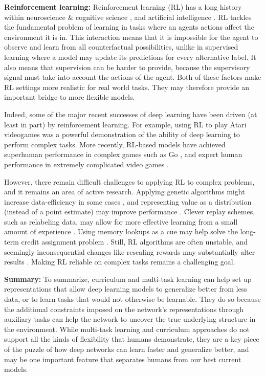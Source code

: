 \textbf{Reinforcement learning:} Reinforcement learning (RL) has a long history within neuroscience \& cognitive science \citep{Odoherty2003,Niv2009,Dabney2020}, and artificial intelligence \citep{Sutton2017}. RL tackles the fundamental problem of learning in tasks where an agents actions affect the environment it is in. This interaction means that it is impossible for the agent to observe and learn from all counterfactual possibilities, unlike in supervised learning where a model may update its predictions for every alternative label. It also means that supervision can be harder to provide, because the supervisory signal must take into account the actions of the agent. Both of these factors make RL settings more realistic for real world tasks. They may therefore provide an important bridge to more flexible models.\par 
Indeed, some of the major recent successes of deep learning have been driven (at least in part) by reinforcement learning. For example, using RL to play Atari videogames \citep{Mnih2015} was a powerful demonstration of the ability of deep learning to perform complex tasks. More recently, RL-based models have achieved superhuman performance in complex games such as Go \citep{Silver2016,Silver2017}, and expert human performance in extremely complicated video games \citep{OpenAI2019,Vinyals2019}. \par
However, there remain difficult challenges to applying RL to complex problems, and it remains an area of active research. Applying genetic algorithms might increase data-efficiency in some cases \citep{Petroski2018}, and representing value as a distribution (instead of a point estimate) may improve performance \citep{Bellemare2017}. Clever replay schemes, such as relabeling data, may allow for more effective learning from a small amount of experience \citep{Andrychowicz2017}. Using memory lookups as a cue may help solve the long-term credit assignment problem \citep{Hung2019}. Still, RL algorithms are often unstable, and seemingly inconsequential changes like rescaling rewards may substantially alter results \citep{Henderson2018}. Making RL reliable on complex tasks remains a challenging goal. \par  

\textbf{Summary:} To summarize, curriculum and multi-task learning can help set up representations that allow deep learning models to generalize better from less data, or to learn tasks that would not otherwise be learnable. They do so because the additional constraints imposed on the network's representations through auxiliary tasks can help the network to uncover the true underlying structure in the environment. While multi-task learning and curriculum approaches do not support all the kinds of flexibility that humans demonstrate, they are a key piece of the puzzle of how deep networks can learn faster and generalize better, and may be one important feature that separates humans from our best current models. \par

